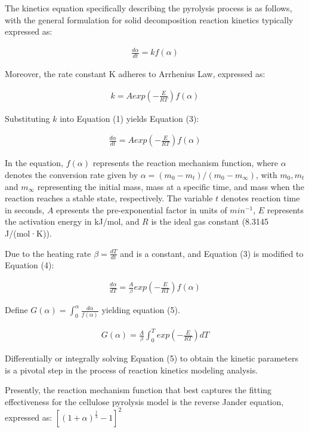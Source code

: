\documentclass{swmcmthesis}
\begin{document}
The kinetics equation specifically describing the pyrolysis process is as follows, with the general formulation for solid decomposition reaction kinetics typically expressed as:

\begin{align}
    \label{eq1}
        \frac{d\alpha}{dt} = kf(\alpha)
\end{align}

Moreover, the rate constant K adheres to Arrhenius Law, expressed as:

\begin{align}
    \label{eq2}
        k = Aexp(-\frac{E}{RT})f(\alpha)
\end{align}

Substituting \(k\) into Equation (1) yields Equation (3):

\begin{align}
    \label{eq3}
        \frac{d\alpha}{dt} = Aexp(-\frac{E}{RT})f(\alpha)
\end{align}

In the equation, $f(\alpha)$ represents the reaction mechanism function, where $\alpha$ denotes the conversion rate given by $\alpha = (m_0-m_t)/(m_0-m_{\infty})$, with $m_0, m_t$ and $m_{\infty}$ representing the initial mass, mass at a specific time, and mass when the reaction reaches a stable state, respectively. The variable 
$t$ denotes reaction time in seconds, $A$ epresents the pre-exponential factor in units of $min^{-1}$, $E$ represents the activation energy in kJ/mol, and $R$
is the ideal gas constant (8.3145 J/(mol·K)).

Due to the heating rate $\beta = \frac{dT}{dt}$ and is a constant, and Equation (3) is modified to Equation (4):

\begin{align}
    \label{eq4}
        \frac{d\alpha}{dT} = \frac{A}{\beta}exp(-\frac{E}{RT})f(\alpha)
\end{align}

Define $G(\alpha) = \int_{0}^{\alpha}\frac{d\alpha}{f(\alpha)}$ yielding equation (5).

\begin{align}
    \label{eq5}
    G(\alpha) = \frac{A}{\beta}\int_{0}^{T}exp(-\frac{E}{RT})dT
\end{align}

Differentially or integrally solving Equation (5) to obtain the kinetic parameters is a pivotal step in the process of reaction kinetics modeling analysis.

Presently, the reaction mechanism function that best captures the fitting effectiveness for the cellulose pyrolysis model is the reverse Jander equation\cite{bib6}, expressed as:
$[(1+\alpha)^{\frac{1}{3}}-1]^2$
\end{document}
